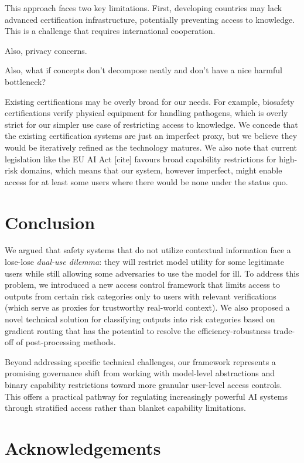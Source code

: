 \documentclass{article}
\theoremstyle{plain}
\theoremstyle{definition}
\theoremstyle{remark}
\begin{document}
This approach faces two key limitations.
First, developing countries may lack advanced certification infrastructure, potentially preventing access to knowledge.
This is a challenge that requires international cooperation.

Also, privacy concerns.

Also, what if concepts don't decompose neatly and don't have a nice harmful bottleneck?

Existing certifications may be overly broad for our needs.
For example, biosafety certifications verify physical equipment for handling pathogens, which is overly strict for our simpler use case of restricting access to knowledge.
We concede that the existing certification systems are just an imperfect proxy, but we believe they would be iteratively refined as the technology matures.
We also note that current legislation like the EU AI Act [cite] favours broad capability restrictions for high-risk domains, which means that our system, however imperfect, might enable access for at least some users where there would be none under the status quo.

\section{Conclusion}

We argued that safety systems that do not utilize contextual
information face a lose-lose \emph{dual-use dilemma}: they will
restrict model utility for some legitimate users while still allowing
some adversaries to use the model for ill. To address this problem,
we introduced a new access control framework that limits access to
outputs from certain risk categories only to users with relevant
verifications (which serve as proxies for trustworthy real-world
context). We also proposed a novel technical solution for classifying
outputs into risk categories based on gradient routing that has the
potential to resolve the efficiency-robustness trade-off of
post-processing methods.

Beyond addressing specific technical challenges, our framework
represents a promising governance shift from working with model-level
abstractions and binary capability restrictions toward more granular
user-level access controls. This offers a practical pathway for
regulating increasingly powerful AI systems through stratified access
rather than blanket capability limitations.

\section*{Acknowledgements}
\end{document}
